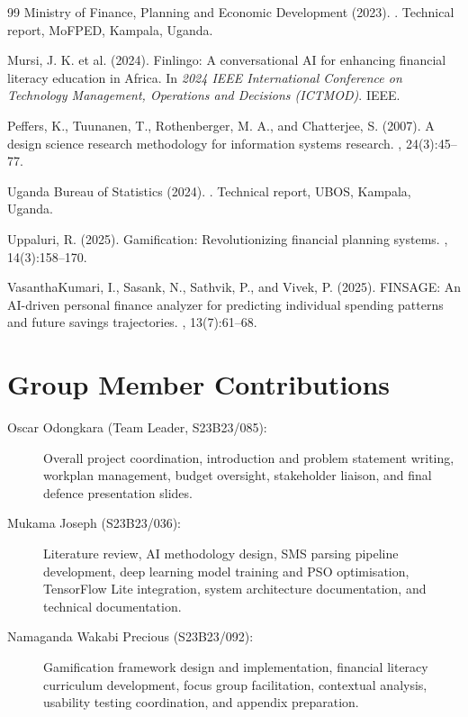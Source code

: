 \documentclass[12pt,a4paper]{report}
\begin{document}
\begin{thebibliography}{99}
Ministry of Finance, Planning and Economic Development (2023).
.
\newblock Technical report, MoFPED, Kampala, Uganda.

Mursi, J. K. et al. (2024).
\newblock Finlingo: A conversational AI for enhancing financial literacy education in Africa.
\newblock In {\em 2024 IEEE International Conference on Technology Management, Operations and Decisions (ICTMOD)}. IEEE.

Peffers, K., Tuunanen, T., Rothenberger, M. A., and Chatterjee, S. (2007).
\newblock A design science research methodology for information systems research.
, 24(3):45--77.

Uganda Bureau of Statistics (2024).
.
\newblock Technical report, UBOS, Kampala, Uganda.

Uppaluri, R. (2025).
\newblock Gamification: Revolutionizing financial planning systems.
, 14(3):158--170.

VasanthaKumari, I., Sasank, N., Sathvik, P., and Vivek, P. (2025).
\newblock FINSAGE: An AI-driven personal finance analyzer for predicting individual spending patterns and future savings trajectories.
, 13(7):61--68.

\end{thebibliography}

\appendix

\chapter{Group Member Contributions}

\begin{description}
    \item[Oscar Odongkara (Team Leader, S23B23/085):] Overall project coordination, introduction and problem statement writing, workplan management, budget oversight, stakeholder liaison, and final defence presentation slides.
    \item[Mukama Joseph (S23B23/036):] Literature review, AI methodology design, SMS parsing pipeline development, deep learning model training and PSO optimisation, TensorFlow Lite integration, system architecture documentation, and technical documentation.
    \item[Namaganda Wakabi Precious (S23B23/092):] Gamification framework design and implementation, financial literacy curriculum development, focus group facilitation, contextual analysis, usability testing coordination, and appendix preparation.
\end{description}
\end{document}
